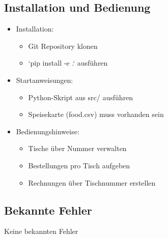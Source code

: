 \documentclass[a4paper,11pt]{article}
\begin{document}
\subsection{Installation und Bedienung}
\begin{itemize}
    \item Installation:
    \begin{itemize}
        \item Git Repository klonen
        \item `pip install -e .` ausführen
    \end{itemize}
    \item Startanweisungen:
    \begin{itemize}
        \item Python-Skript aus src/ ausführen
        \item Speisekarte (food.csv) muss vorhanden sein
    \end{itemize}
    \item Bedienungshinweise:
    \begin{itemize}
        \item Tische über Nummer verwalten
        \item Bestellungen pro Tisch aufgeben
        \item Rechnungen über Tischnummer erstellen
    \end{itemize}
\end{itemize}

\subsection{Bekannte Fehler}
Keine bekannten Fehler
\end{document}
